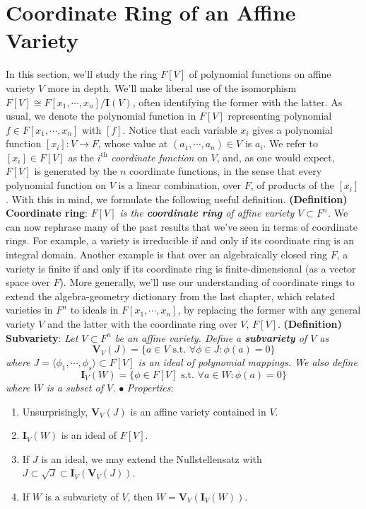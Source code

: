 \documentclass{article}
\newcommand*{\tb}{\textbf}
\newcommand*{\ti}{\textit}
\newcommand*{\n}{\newline}
\newcommand*{\nn}{\newline \newline}
\newcommand*{\Fx}{\ensuremath{F[x_1, \cdots, x_n]}}
\newcommand*{\IV}{\ensuremath{\mathbf{I}(V)}}
\begin{document}
\section{Coordinate Ring of an Affine Variety}
In this section, we'll study the ring $ F[V] $ of polynomial functions on affine variety $ V $ more in depth. We'll make liberal use of the isomorphism $ F[V] \cong \Fx / \IV $, often identifying the former with the latter. As usual, we denote the polynomial function in $ F[V] $ representing polynomial $ f \in \Fx $ with $ [ f ] $. Notice that each variable $ x_i $ gives a polynomial function $ [ x_i ]: V \rightarrow F $, whose value at $ (a_1, \cdots, a_n) \in V $ is $ a_i $. We refer to $ [ x_i ] \in F[V] $ as the $ i^{\text{th}} $ \textit{coordinate function} on $ V $, and, as one would expect, $ F[V] $ is generated by the $ n $ coordinate functions, in the sense that every polynomial function on $ V $ is a linear combination, over $ F $, of products of the $ [ x_i ] $. With this in mind, we formulate the following useful definition.
\nn
\tb{(Definition) Coordinate ring}: \ti{$ F[V] $ is the \tb{coordinate ring} of affine variety $ V \subset F^n $.}
\nn
We can now rephrase many of the past results that we've seen in terms of coordinate rings. For example, a variety is irreducible if and only if its coordinate ring is an integral domain. Another example is that over an algebraically closed ring $ F $, a variety is finite if and only if its coordinate ring is finite-dimensional (as a vector space over $ F $). More generally, we'll use our understanding of coordinate rings to extend the algebra-geometry dictionary from the last chapter, which related varieties in $ F^n $ to ideals in $ \Fx $, by replacing the former with any general variety $ V $ and the latter with the coordinate ring over $ V $, $ F[V] $.
\nn
\tb{(Definition) Subvariety}: \ti{Let $ V \subset F^n $ be an affine variety. Define a \tb{subvariety} of $ V $ as}
$$ \mathbf{V}_V(J) = \{ a \in V \text{ s.t. } \forall \phi \in J: \phi(a) = 0 \} $$
\indent \ti{where $ J = \langle \phi_1, \cdots, \phi_s \rangle \subset F[V] $ is an ideal of polynomial mappings. We also define}
$$ \mathbf{I}_V(W) = \{ \phi \in F[V] \text{ s.t. } \forall a \in W: \phi(a) = 0 \} $$
\indent \ti{where $ W $ is a subset of $ V $.}
\n
\indent $ \bullet $ \ti{Properties}: 
\begin{enumerate}
    \item Unsurprisingly, $ \mathbf{V}_V(J) $ is an affine variety contained in $ V $.
    \item $ \mathbf{I}_V(W) $ is an ideal of $ F[V] $.
    \item If $ J $ is an ideal, we may extend the Nullstellensatz with $ J \subset \sqrt{J} \subset \mathbf{I}_V(\mathbf{V}_V(J)) $.
    \item If $ W $ is a subvariety of $ V $, then $ W = \mathbf{V}_V(\mathbf{I}_V(W)) $.
\end{enumerate}
\end{document}
